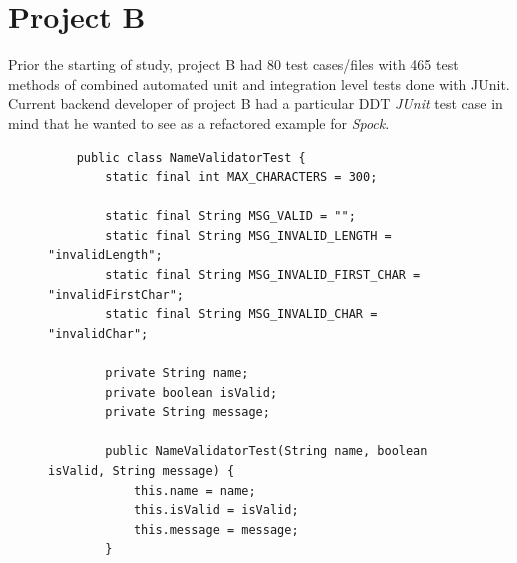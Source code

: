     \clearpage

    \section{Project B}
    Prior the starting of study, project B had 80 test cases/files with 465 test methods of combined automated unit and integration level tests done with JUnit.
    Current backend developer of project B had a particular DDT \textit{JUnit} test case in mind that he wanted to see as a refactored example
    for \textit{Spock}.

    \begin{figure}[H]
        \begin{lstlisting}[style=javatiny]
    %%@RunWith%%(Parameterized.class)
    public class NameValidatorTest {
        static final int MAX_CHARACTERS = 300;

        static final String MSG_VALID = "";
        static final String MSG_INVALID_LENGTH = "invalidLength";
        static final String MSG_INVALID_FIRST_CHAR = "invalidFirstChar";
        static final String MSG_INVALID_CHAR = "invalidChar";

        private String name;
        private boolean isValid;
        private String message;

        public NameValidatorTest(String name, boolean isValid, String message) {
            this.name = name;
            this.isValid = isValid;
            this.message = message;
        }


\end{lstlisting}
\end{figure}
